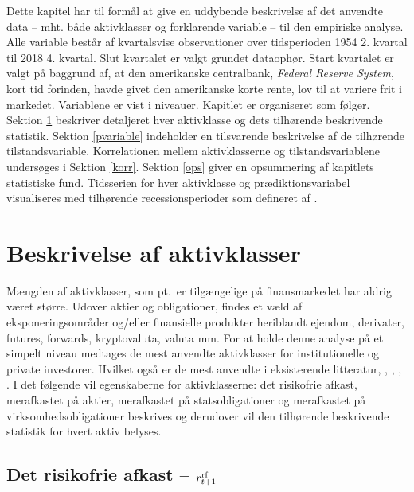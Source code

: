 \documentclass[
  a4paper,
  oneside]{memoir}
\begin{document}
Dette kapitel har til formål at give en uddybende beskrivelse af det anvendte data -- mht. både aktivklasser og forklarende variable -- til den empiriske analyse. Alle variable består af kvartalsvise observationer over tidsperioden 1954 2. kvartal til 2018 4. kvartal. Slut kvartalet er valgt grundet dataophør. Start kvartalet er valgt på baggrund af, at den amerikanske centralbank, \emph{Federal Reserve System}, kort tid forinden, havde givet den amerikanske korte rente, lov til at variere frit i markedet. Variablene er vist i niveauer. Kapitlet er organiseret som følger. Sektion \ref{aktivklasser} beskriver detaljeret hver aktivklasse og dets tilhørende beskrivende statistik. Sektion \ref{pvariable} indeholder en tilsvarende beskrivelse af de tilhørende tilstandsvariable. Korrelationen mellem aktivklasserne og tilstandsvariablene undersøges i Sektion \ref{korr}. Sektion \ref{ops} giver en opsummering af kapitlets statistiske fund. Tidsserien for hver aktivklasse og prædiktionsvariabel visualiseres med tilhørende recessionsperioder som defineret af \citep{NBER2020}.

\hypertarget{aktivklasser}{%
\section{Beskrivelse af aktivklasser}\label{aktivklasser}}

Mængden af aktivklasser, som pt.~er tilgængelige på finansmarkedet har aldrig været større. Udover aktier og obligationer, findes et væld af eksponeringsområder og/eller finansielle produkter heriblandt ejendom, derivater, futures, forwards, kryptovaluta, valuta mm. For at holde denne analyse på et simpelt niveau medtages de mest anvendte aktivklasser for institutionelle og private investorer. Hvilket også er de mest anvendte i eksisterende litteratur, \citep{CampVic2003, CampVic1999}, \citep{JurVic2011}, \citep{Engsted2012}, \citep{CampVicCha2003}. I det følgende vil egenskaberne for aktivklasserne: det risikofrie afkast, merafkastet på aktier, merafkastet på statsobligationer og merafkastet på virksomhedsobligationer beskrives og derudover vil den tilhørende beskrivende statistik for hvert aktiv belyses.

\hypertarget{det-risikofrie-afkast-r_t1textnormalrf}{%
\subsection{\texorpdfstring{Det risikofrie afkast -- \(r_{t+1}^{\textnormal{rf}}\)}{Det risikofrie afkast -- r\_\{t+1\}\^{}\{\textbackslash textnormal\{rf\}\}}}\label{det-risikofrie-afkast-r_t1textnormalrf}}
\end{document}
